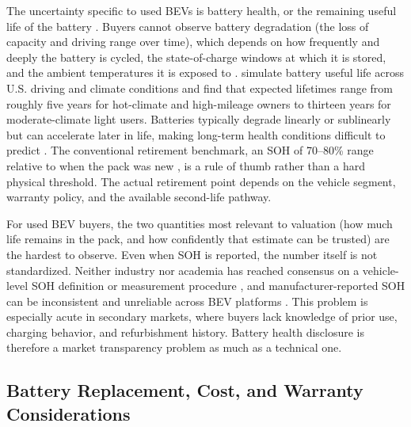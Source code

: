 \documentclass[a4paper,fleqn]{cas-sc}   %
\begin{document}
The uncertainty specific to used BEVs is battery health, or the remaining useful life of the battery \parencite{pedrosaSecondhandElectricalVehicles2018}. Buyers cannot observe battery degradation (the loss of capacity and driving range over time), which depends on how frequently and deeply the battery is cycled, the state-of-charge windows at which it is stored, and the ambient temperatures it is exposed to \parencite{bashashPluginHybridElectric2011, neubauerSensitivityBatteryElectric2012}. \textcite{yangPredictiveModelingBattery2018} simulate battery useful life across U.S. driving and climate conditions and find that expected lifetimes range from roughly five years for hot-climate and high-mileage owners to thirteen years for moderate-climate light users. Batteries typically degrade linearly or sublinearly but can accelerate later in life, making long-term health conditions difficult to predict \parencite{attiaReviewKneesLithiumIonBattery2022}. The conventional retirement benchmark, an SOH of 70--80\% range relative to when the pack was new \parencite{canalscasalsEvaluationEndofLifeElectric2019}, is a rule of thumb rather than a hard physical threshold. The actual retirement point depends on the vehicle segment, warranty policy, and the available second-life pathway.

For used BEV buyers, the two quantities most relevant to valuation (how much life remains in the pack, and how confidently that estimate can be trusted) are the hardest to observe. Even when SOH is reported, the number itself is not standardized. Neither industry nor academia has reached consensus on a vehicle-level SOH definition or measurement procedure \parencite{bilfingerWhyWeNeed2025}, and manufacturer-reported SOH can be inconsistent and unreliable across BEV platforms \parencite{parkBatteryHealthReporting2026}. This problem is especially acute in secondary markets, where buyers lack knowledge of prior use, charging behavior, and refurbishment history. Battery health disclosure is therefore a market transparency problem as much as a technical one.

\subsection{Battery Replacement, Cost, and Warranty Considerations}
\end{document}

